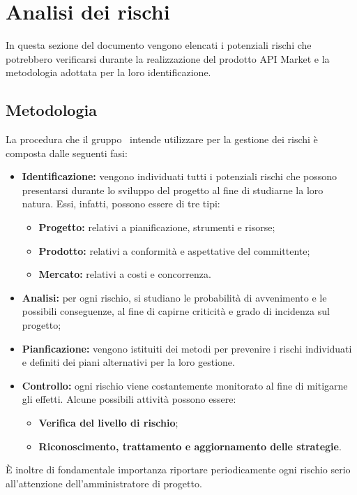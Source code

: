 \newpage
\section{Analisi dei rischi}
In questa sezione del documento vengono elencati i potenziali rischi che potrebbero verificarsi durante la realizzazione del prodotto API Market e la metodologia adottata per la loro identificazione.

\subsection{Metodologia}

La procedura che il gruppo \gruppo\ intende utilizzare per la gestione dei rischi è composta dalle seguenti fasi:
\begin{itemize}
	\item \textbf{Identificazione:} vengono individuati tutti i potenziali rischi che possono presentarsi durante lo sviluppo del progetto al fine di studiarne la loro natura. Essi, infatti, possono essere di tre tipi:
	\begin{itemize}
		\item \textbf{Progetto:} relativi a pianificazione, strumenti e risorse;
		\item \textbf{Prodotto:} relativi a conformità e aspettative del committente;
		\item \textbf{Mercato:} relativi a costi e concorrenza.
	\end{itemize}
	\item \textbf{Analisi:} per ogni rischio, si studiano le probabilità di avvenimento e le possibili conseguenze, al fine di capirne criticità e grado di incidenza sul progetto;
	\item \textbf{Pianficazione:} vengono istituiti dei metodi  per prevenire i rischi individuati e definiti dei piani alternativi per la loro gestione.
	\item \textbf{Controllo:} ogni rischio viene costantemente monitorato al fine di mitigarne gli effetti. Alcune possibili attività possono essere:
		\begin{itemize}
		\item \textbf{Verifica del livello di rischio};
		\item \textbf{Riconoscimento, trattamento e aggiornamento delle strategie}.
		\end{itemize}
	\end{itemize}
\MakeUppercase{è} inoltre di fondamentale importanza riportare periodicamente ogni rischio serio all'attenzione dell'amministratore di progetto.

